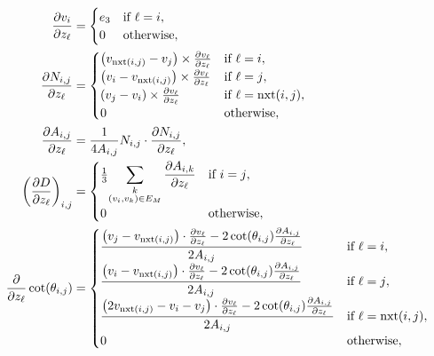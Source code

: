 \begin{align*}
	\frac{\partial v_i}{\partial z_\ell} &= \begin{cases}
		e_3 & \text{if \(\ell = i\)}, \\
		0 & \text{otherwise},
	\end{cases} \\
	\frac{\partial N_{i, j}}{\partial z_\ell} &= \begin{cases}
		\pof{v_{\nxt\pof{i, j}} - v_j} \times \frac{\partial v_\ell}{\partial z_\ell} & \text{if \(\ell = i\)}, \\
		\pof{v_i - v_{\nxt\pof{i, j}}} \times \frac{\partial v_\ell}{\partial z_\ell} & \text{if \(\ell = j\)}, \\
		\pof{v_j - v_i} \times \frac{\partial v_\ell}{\partial z_\ell} & \text{if \(\ell = \nxt\pof{i, j}\)}, \\
		0 & \text{otherwise},
	\end{cases} \\
	\frac{\partial A_{i, j}}{\partial z_\ell} &= \frac{1}{4A_{i, j}}N_{i, j} \cdot \frac{\partial N_{i, j}}{\partial z_\ell}, \\
	\pof{\frac{\partial D}{\partial z_\ell}}_{i, j} &= \begin{cases}
		\frac{1}{3}{\displaystyle\sum_{\substack{k \\ \pof{v_i, v_k} \in E_M}}\frac{\partial A_{i, k}}{\partial z_\ell}} & \text{if \(i = j\)}, \\
		0 & \text{otherwise},
	\end{cases} \\
	\frac{\partial}{\partial z_\ell}\cot\pof{\theta_{i, j}} &= \begin{cases}
		\displaystyle\frac{\pof{v_j - v_{\nxt\pof{i, j}}} \cdot \frac{\partial v_\ell}{\partial z_\ell} - 2\cot\pof{\theta_{i, j}}\frac{\partial A_{i, j}}{\partial z_\ell}}{2A_{i, j}} & \text{if \(\ell = i\)}, \\
		\displaystyle\frac{\pof{v_i - v_{\nxt\pof{i, j}}} \cdot \frac{\partial v_\ell}{\partial z_\ell} - 2\cot\pof{\theta_{i, j}}\frac{\partial A_{i, j}}{\partial z_\ell}}{2A_{i, j}} & \text{if \(\ell = j\)}, \\
		\displaystyle\frac{\pof{2v_{\nxt\pof{i, j}} - v_i - v_j} \cdot \frac{\partial v_\ell}{\partial z_\ell} - 2\cot\pof{\theta_{i, j}}\frac{\partial A_{i, j}}{\partial z_\ell}}{2A_{i, j}} & \text{if \(\ell = \nxt\pof{i, j}\)}, \\
		0 & \text{otherwise},
	\end{cases} \\

\end{align*}
